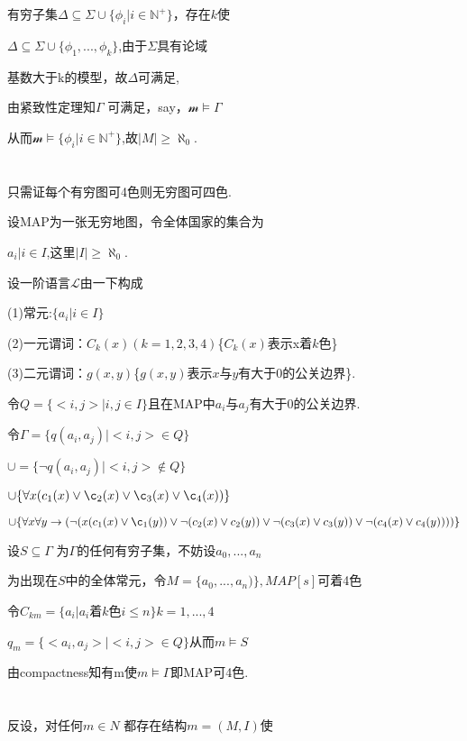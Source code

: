 \documentclass{article}
\begin{document}
\begin{CJK*}{UTF8}{gbsn}
有穷子集$\Delta \subseteq \Sigma \cup \{ \phi_i | i  \in \mathbb{N}^+ \} $，存在$k$使

$\Delta \subseteq \Sigma \cup \{ \phi_1 ,..., \phi_k\} $,由于$\Sigma$具有论域

基数大于k的模型，故$\Delta$可满足,

由紧致性定理知$\Gamma$ 可满足，say，$\mathscr{m} \vDash \Gamma$

从而$\mathscr{m} \vDash \{ \phi_i | i  \in \mathbb{N}^+\}$,故$|M|\geq \aleph_0$.


\section{}

只需证每个有穷图可4色则无穷图可四色.

设MAP为一张无穷地图，令全体国家的集合为

${a_i |i\in I}$,这里$|I|\geq \aleph_0$.

设一阶语言$\mathcal{L}$由一下构成

(1)常元:$\{a_i | i\in I\}$

(2)一元谓词：$C_k (x) (k=1,2,3,4)$\{$C_k (x)$表示x着$k$色\}

(3)二元谓词：$g(x,y)$\{$g(x,y)$表示$x$与$y$有大于0的公关边界\}.

令$Q = \{<i,j>|i,j\in I\}$且在MAP中$a_i$与$a_j$有大于0的公关边界.

令$\Gamma = \{q(a_i,a_j) | <i,j> \in Q\}$

$\cup = \{\neg q(a_i,a_j) | <i,j> \notin Q\}$

$\cup\{ \forall x(c_1(x)\vee \c_2(x)\vee \c_3(x)\vee \c_4(x))\}$

$\cup\{ \forall x \forall y \rightarrow (\neg ( x(c_1(x)\vee \c_1(y))  \vee \neg(c_2(x)\vee c_2(y))\vee \neg(c_3(x)\vee c_3(y))\vee \neg(c_4(x)\vee c_4(y))))\}$

设$S\subseteq \Gamma$ 为$\Gamma$的任何有穷子集，不妨设$a_0,...,a_n$

为出现在$S$中的全体常元，令$M=\{a_0,...,a_n)\},MAP[s]$可着4色

令$C_{km}=\{a_i|a_i$着$k$色$i\leq n\}k=1,...,4$

$q_m =\{<a_i,a_j>|<i,j>\in Q\}$从而$m \vDash S$

由compactness知有m使$m\vDash \Gamma $即MAP可4色.

\section{}
反设，对任何$m\in N$ 都存在结构$m=(M,I)$使


\end{CJK*}
\end{document}
